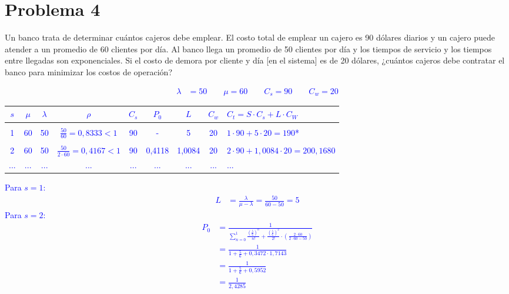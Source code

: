 \documentclass{templateNote}
\newcommand{\newparagraph}{\par\vspace{\baselineskip}\noindent}
\begin{document}
\section{Problema 4}
Un banco trata de determinar cuántos cajeros debe emplear. El costo total de emplear un cajero es 90 dólares diarios y un cajero puede atender a un promedio de 60 clientes por día. Al banco llega un promedio de 50 clientes por día y los tiempos de servicio y los tiempos entre llegadas son exponenciales. Si el costo de demora por cliente y día [en el sistema] es de 20 dólares, ¿cuántos cajeros debe contratar el banco para minimizar los costos de operación?
\textcolor{blue}{
    \begin{align*}
        \lambda &= 50 \qquad \mu = 60 \qquad C_s = 90 \qquad C_w = 20
    \end{align*}
    \begin{center}
        \begin{tabular}{c|c|c|c|c|c|c|c|l}
            $s$ & $\mu$ & $\lambda$ & $\rho$ & $C_s$ & $P_0$ & $L$ & $C_w$ & $C_t = S \cdot C_s + L \cdot C_W$\\ \hline
            & & & & & & & \\
            1 & 60 & 50 & $\displaystyle\frac{50}{60} = 0,8333 < 1$ & 90 & - & 5 & 20 & $1 \cdot 90 + 5 \cdot 20 = 190$* \\
            & & & & & & & \\
            2 & 60 & 50 & $\displaystyle\frac{50}{2 \cdot 60} = 0,4167 < 1$ & 90 & 0,4118 & 1,0084& 20 & $2 \cdot 90 + 1,0084 \cdot 20 = 200,1680$ \\
            ... & ... & ... & ... & ... & ... & ... & ... & ... \\
        \end{tabular}
    \end{center}
    \newparagraph
    Para $s = 1$:
    \begin{align*}
        L &= \frac{\lambda}{\mu - \lambda} = \frac{50}{60 - 50} = 5
    \end{align*}
    Para $s = 2$:
    \begin{align*}
        P_0 &= \frac{1}{\displaystyle\sum_{n=0}^{1} \frac{\left(\frac{5}{6}\right)^n}{n!} + \frac{\left(\frac{5}{6}\right)^2}{2!} \cdot \left(\frac{2 \cdot 60}{2 \cdot 60 - 50}\right)} \\
        &= \frac{1}{1 + \frac{5}{6} + 0,3472 \cdot 1,7143} \\
        &= \frac{1}{1 + \frac{5}{6} + 0,5952} \\
        &= \frac{1}{2,4285} \\

\end{align*}}
\end{document}
